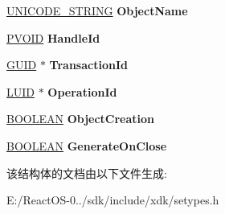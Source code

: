 \begin{DoxyCompactItemize}
\hyperlink{struct___u_n_i_c_o_d_e___s_t_r_i_n_g}{U\+N\+I\+C\+O\+D\+E\+\_\+\+S\+T\+R\+I\+NG} {\bfseries Object\+Name}
\item 
\mbox{\label{struct___s_e___a_u_d_i_t___i_n_f_o_a07d36d661f42aceef51c9e29b874174c}} 
\hyperlink{interfacevoid}{P\+V\+O\+ID} {\bfseries Handle\+Id}
\item 
\mbox{\label{struct___s_e___a_u_d_i_t___i_n_f_o_a04bfa56c3a0505f1c66cc7a150811a85}} 
\hyperlink{interface_g_u_i_d}{G\+U\+ID} $\ast$ {\bfseries Transaction\+Id}
\item 
\mbox{\label{struct___s_e___a_u_d_i_t___i_n_f_o_a716566677ddf67de9e51d5eefceaf13f}} 
\hyperlink{struct___l_u_i_d}{L\+U\+ID} $\ast$ {\bfseries Operation\+Id}
\item 
\mbox{\label{struct___s_e___a_u_d_i_t___i_n_f_o_a975100ad8020043580ed0ec475089df4}} 
\hyperlink{_processor_bind_8h_a112e3146cb38b6ee95e64d85842e380a}{B\+O\+O\+L\+E\+AN} {\bfseries Object\+Creation}
\item 
\mbox{\label{struct___s_e___a_u_d_i_t___i_n_f_o_abbf85936a76579f0638b2016f612ff8b}} 
\hyperlink{_processor_bind_8h_a112e3146cb38b6ee95e64d85842e380a}{B\+O\+O\+L\+E\+AN} {\bfseries Generate\+On\+Close}
\end{DoxyCompactItemize}


该结构体的文档由以下文件生成\+:\begin{DoxyCompactItemize}
\item 
E\+:/\+React\+O\+S-\/0../sdk/include/xdk/setypes.\+h\end{DoxyCompactItemize}
